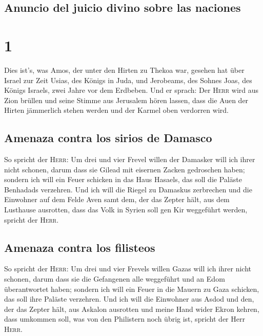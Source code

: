 \hypertarget{anuncio-del-juicio-divino-sobre-las-naciones}{%
\subsection{Anuncio del juicio divino sobre las
naciones}\label{anuncio-del-juicio-divino-sobre-las-naciones}}

\hypertarget{section}{%
\section{1}\label{section}}

 Dies ist's, was Amos, der unter den Hirten zu Thekoa war,
gesehen hat über Israel zur Zeit Usias, des Königs in Juda, und
Jerobeams, des Sohnes Joas, des Königs Israels, zwei Jahre vor dem
Erdbeben.  Und er sprach: Der \textsc{Herr} wird aus Zion
brüllen und seine Stimme aus Jerusalem hören lassen, dass die Auen der
Hirten jämmerlich stehen werden und der Karmel oben verdorren wird.

\hypertarget{amenaza-contra-los-sirios-de-damasco}{%
\subsection{Amenaza contra los sirios de
Damasco}\label{amenaza-contra-los-sirios-de-damasco}}

 So spricht der \textsc{Herr}: Um drei und vier Frevel
willen der Damasker will ich ihrer nicht schonen, darum dass sie Gilead
mit eisernen Zacken gedroschen haben;  sondern ich will
ein Feuer schicken in das Haus Hasaels, das soll die Paläste Benhadads
verzehren.  Und ich will die Riegel zu Damaskus zerbrechen
und die Einwohner auf dem Felde Aven samt dem, der das Zepter hält, aus
dem Lusthause ausrotten, dass das Volk in Syrien soll gen Kir weggeführt
werden, spricht der \textsc{Herr}.

\hypertarget{amenaza-contra-los-filisteos}{%
\subsection{Amenaza contra los
filisteos}\label{amenaza-contra-los-filisteos}}

 So spricht der \textsc{Herr}: Um drei und vier Frevels
willen Gazas will ich ihrer nicht schonen, darum dass sie die Gefangenen
alle weggeführt und an Edom überantwortet haben;  sondern
ich will ein Feuer in die Mauern zu Gaza schicken, das soll ihre Paläste
verzehren.  Und ich will die Einwohner aus Asdod und den,
der das Zepter hält, aus Askalon ausrotten und meine Hand wider Ekron
kehren, dass umkommen soll, was von den Philistern noch übrig ist,
spricht der Herr \textsc{Herr}.

